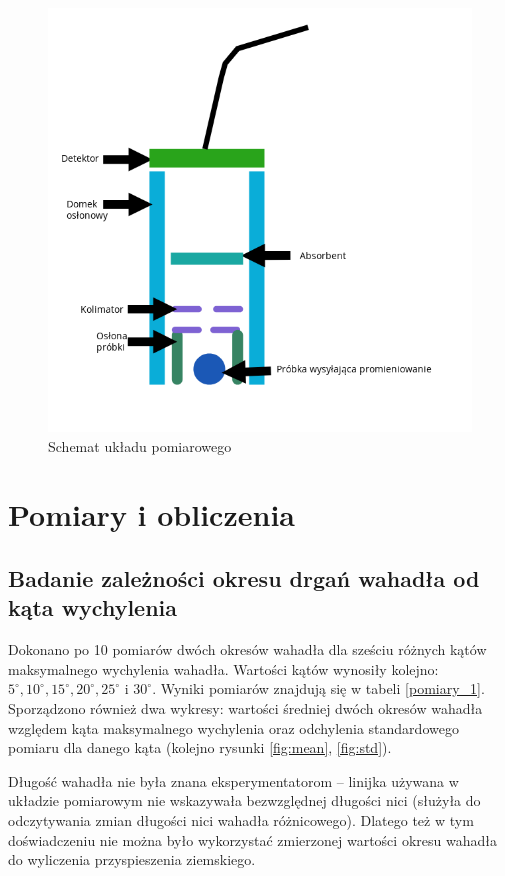 \documentclass[a4paper]{article}
\newlength{\du}
\begin{document}
\begin{figure}[h]
\centering
\includegraphics[scale=0.6]{schemat_ukladu}
\caption{Schemat układu pomiarowego}
\label{uklad_pomiarowy}
\end{figure}


\section{Pomiary i obliczenia}
\subsection{Badanie zależności okresu drgań wahadła od kąta wychylenia}

Dokonano po 10 pomiarów dwóch okresów wahadła dla sześciu różnych kątów maksymalnego wychylenia wahadła. 
Wartości kątów wynosiły kolejno:
$5^\circ, 10^\circ, 15^\circ, 20^\circ, 25^\circ$ i $30^\circ$. 
Wyniki pomiarów znajdują się w tabeli \ref{pomiary_1}. Sporządzono również dwa wykresy: 
wartości średniej dwóch okresów wahadła względem kąta maksymalnego wychylenia oraz 
odchylenia standardowego pomiaru dla danego kąta (kolejno rysunki \ref{fig:mean}, \ref{fig:std}).

Długość wahadła nie była znana eksperymentatorom -- linijka używana w układzie pomiarowym
nie wskazywała bezwzględnej długości nici (służyła do odczytywania zmian długości nici wahadła różnicowego). 
Dlatego też w tym doświadczeniu nie można było wykorzystać zmierzonej wartości okresu
wahadła do wyliczenia przyspieszenia ziemskiego.
\end{document}
